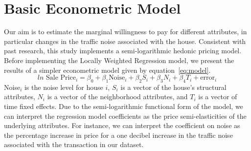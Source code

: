 \documentclass{article}\usepackage[]{graphicx}\usepackage[]{color}
\begin{document}
\section{Basic Econometric Model}\label{basicModel}
Our aim is to estimate the marginal willingness to pay for different attributes, in particular changes in the traffic noise associated with the house. Consistent with past research, this study implements a semi-logarithmic hedonic pricing model.  Before implementing the Locally Weighted Regression model, we present the results of a simpler econometric model given by equation~\eqref{eq:model}.
\begin{equation}\label{eq:model}	
ln \textrm{ Sale Price}_i = \beta _0 + \beta _1 \textrm{Noise}_i+ \beta _2 S_i+ \beta _3 N_i + \beta _4 T_i + \textrm{error}_i
\end{equation}
Noise$_i$ is the noise level for house $i$, $S_i$ is a vector of the house's structural attributes, $N_i$ is a vector of the neighborhood attributes, and $T_i$ is a vector of time fixed effects. Due to the semi-logarithmic functional form of the model, we can interpret the regression model coefficients as the price semi-elasticities of the underlying attributes. For instance, we can interpret the coefficient on noise as the percentage increase in price for a one decibel increase in the traffic noise associated with the transaction in our dataset. 
\end{document}
